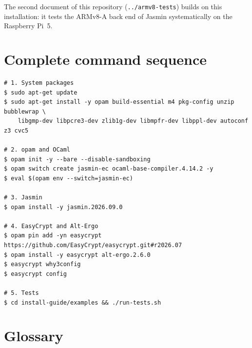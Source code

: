 \documentclass[11pt,a4paper]{article}
\newcommand{\file}[1]{\texttt{#1}}
\begin{document}
The second document of this repository (\file{../armv8-tests}) builds on
this installation: it tests the ARMv8-A back end of Jasmin systematically on
the Raspberry Pi~5.

\appendix
\section{Complete command sequence}
\label{app:commands}

\begin{lstlisting}[style=shell]
# 1. System packages
$ sudo apt-get update
$ sudo apt-get install -y opam build-essential m4 pkg-config unzip bubblewrap \
    libgmp-dev libpcre3-dev zlib1g-dev libmpfr-dev libppl-dev autoconf z3 cvc5

# 2. opam and OCaml
$ opam init -y --bare --disable-sandboxing
$ opam switch create jasmin-ec ocaml-base-compiler.4.14.2 -y
$ eval $(opam env --switch=jasmin-ec)

# 3. Jasmin
$ opam install -y jasmin.2026.09.0

# 4. EasyCrypt and Alt-Ergo
$ opam pin add -yn easycrypt https://github.com/EasyCrypt/easycrypt.git#r2026.07
$ opam install -y easycrypt alt-ergo.2.6.0
$ easycrypt why3config
$ easycrypt config

# 5. Tests
$ cd install-guide/examples && ./run-tests.sh
\end{lstlisting}

\section{Glossary}
\label{app:glossary}
\end{document}
